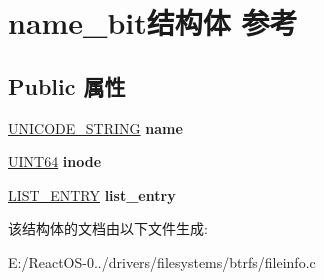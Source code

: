 \hypertarget{structname__bit}{}\section{name\+\_\+bit结构体 参考}
\label{structname__bit}
\subsection*{Public 属性}
\begin{DoxyCompactItemize}
\item 
\mbox{\label{structname__bit_a3307e1e4d1e09b2f5f4ff19f6f7eaccc}} 
\hyperlink{struct___u_n_i_c_o_d_e___s_t_r_i_n_g}{U\+N\+I\+C\+O\+D\+E\+\_\+\+S\+T\+R\+I\+NG} {\bfseries name}
\item 
\mbox{\label{structname__bit_a5668972cd3232bf904bc8b919ea66e4c}} 
\hyperlink{_processor_bind_8h_a57be03562867144161c1bfee95ca8f7c}{U\+I\+N\+T64} {\bfseries inode}
\item 
\mbox{\label{structname__bit_a9c1268c870325f627d2b20897421c513}} 
\hyperlink{struct___l_i_s_t___e_n_t_r_y}{L\+I\+S\+T\+\_\+\+E\+N\+T\+RY} {\bfseries list\+\_\+entry}
\end{DoxyCompactItemize}


该结构体的文档由以下文件生成\+:\begin{DoxyCompactItemize}
\item 
E\+:/\+React\+O\+S-\/0../drivers/filesystems/btrfs/fileinfo.\+c\end{DoxyCompactItemize}
